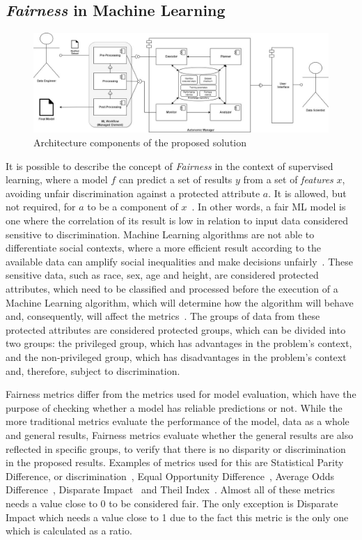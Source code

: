 \documentclass[sigconf]{acmart}
\begin{document}
\subsection{\textit{Fairness} in Machine Learning}

\begin{figure}[h]
\centering
\includegraphics[scale=0.4]{images/backend-frontend-ml-eng.jpg}
\caption {Architecture components of the proposed solution}
\label{fig:BackendFrontendML}
\end{figure}

It is possible to describe the concept of \textit{Fairness} in the context of supervised learning, where a model $f$ can predict a set of results $y$ from a set of \textit{features} $x$, avoiding unfair discrimination against a protected attribute $a$. It is allowed, but not required, for $a$ to be a component of $x$~\citep{Begley_2021}. In other words, a fair ML model is one where the correlation of its result is low in relation to input data considered sensitive to discrimination. Machine Learning algorithms are not able to differentiate social contexts, where a more efficient result according to the available data can amplify social inequalities and make decisions unfairly~\citep{Mehrabi_2021}. These sensitive data, such as race, sex, age and height, are considered protected attributes, which need to be classified and processed before the execution of a Machine Learning algorithm, which will determine how the algorithm will behave and, consequently, will affect the metrics~\citep{Mougan_2022}. The groups of data from these protected attributes are considered protected groups, which can be divided into two groups: the privileged group, which has advantages in the problem's context, and the non-privileged group, which has disadvantages in the problem's context and, therefore, subject to discrimination.

Fairness metrics differ from the metrics used for model evaluation, which have the purpose of checking whether a model has reliable predictions or not. While the more traditional metrics evaluate the performance of the model, data as a whole and general results, Fairness metrics evaluate whether the general results are also reflected in specific groups, to verify that there is no disparity or discrimination in the proposed results. Examples of metrics used for this are Statistical Parity Difference, or discrimination~\citep{Zemel_2013}, Equal Opportunity Difference~\citep{Biswas_2020}, Average Odds Difference~\citep{Biswas_2020}, Disparate Impact~\citep{Biswas_2020} and Theil Index~\citep{Speicher_2018}. Almost all of these metrics needs a value close to 0 to be considered fair. The only exception is Disparate Impact which needs a value close to 1 due to the fact this metric is the only one which is calculated as a ratio.
\end{document}
